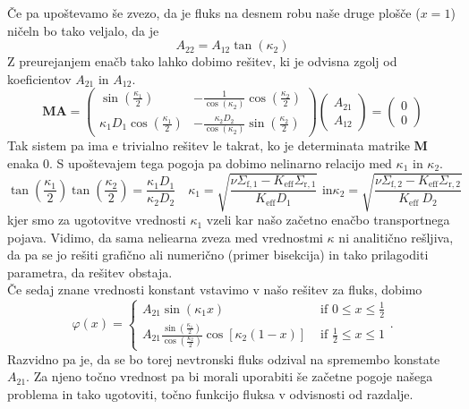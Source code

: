 \documentclass[slovene,11pt,a4paper]{article}
\def\phi{\varphi}
\begin{document}
Če pa upoštevamo še zvezo, da je fluks na desnem robu naše druge plošče ($x=1$) ničeln bo tako veljalo, da je
\begin{equation}
A_{22}=A_{12} \tan \left(\kappa_{2}\right)
\end{equation}
Z preurejanjem enačb tako lahko dobimo rešitev, ki je odvisna zgolj od koeficientov $A_{21}$ in $A_{12}$.
\begin{equation}
\textbf{M}\textbf{A}=\left(\begin{array}{cc}
\sin \left(\frac{\kappa_{1}}{2}\right) & -\frac{1}{\cos \left(\kappa_{2}\right)} \cos \left(\frac{\kappa_{2}}{2}\right) \\
\kappa_{1} D_{1} \cos \left(\frac{\kappa_{1}}{2}\right) & -\frac{\kappa_{2} D_{2}}{\cos \left(\kappa_{2}\right)} \sin \left(\frac{\kappa_{2}}{2}\right)
\end{array}\right)\left(\begin{array}{l}
A_{21} \\
A_{12}
\end{array}\right)=\left(\begin{array}{l}
0 \\
0
\end{array}\right)
\end{equation}
Tak sistem pa ima e
trivialno rešitev le takrat, ko je determinata matrike $\textbf{M}$ enaka 0. S upoštevajem tega pogoja pa dobimo nelinarno relacijo med $\kappa_1$ in $\kappa_2$. 
\begin{equation}
\tan \left(\frac{\kappa_{1}}{2}\right) \tan \left(\frac{\kappa_{2}}{2}\right)=\frac{\kappa_{1} D_{1}}{\kappa_{2} D_{2}} \quad \kappa_{1}=\sqrt{\frac{\nu \Sigma_{\mathrm{f}, 1}-K_{\mathrm{eff}} \Sigma_{\mathrm{r}, 1}}{K_{\mathrm{eff}} D_{1}}} \text { in} \kappa_{2}=\sqrt{\frac{\nu \Sigma_{\mathrm{f}, 2}-K_{\mathrm{eff}} \Sigma_{\mathrm{r}, 2}}{K_{\text {eff }} D_{2}}}
\end{equation}
kjer smo za ugotovitve vrednosti $\kappa_1$ vzeli kar našo začetno enačbo transportnega pojava. Vidimo, da sama neliearna zveza med vrednostmi $\kappa$ ni analitično rešljiva, da pa se jo rešiti grafično ali numerično (primer bisekcija) in tako prilagoditi parametra, da rešitev obstaja. \\

Če sedaj znane vrednosti konstant vstavimo v našo rešitev za fluks, dobimo 
\begin{equation}
\phi(x)= \begin{cases}A_{21} \sin \left(\kappa_{1} x\right) & \text { if } 0 \leq x \leq \frac{1}{2} \\ A_{21} \frac{\sin \left(\frac{\kappa_{1}}{2}\right)}{\cos \left(\frac{\kappa_{2}}{2}\right)} \cos \left[\kappa_{2}(1-x)\right] & \text { if } \frac{1}{2} \leq x \leq 1\end{cases}.
\end{equation}
Razvidno pa je, da se bo torej nevtronski fluks odzival na spremembo konstate $A_{21}$. Za njeno točno vrednost pa bi morali uporabiti še začetne pogoje našega problema in tako ugotoviti, točno funkcijo fluksa v odvisnosti od razdalje. \cite{Homogeni}
\end{document}
